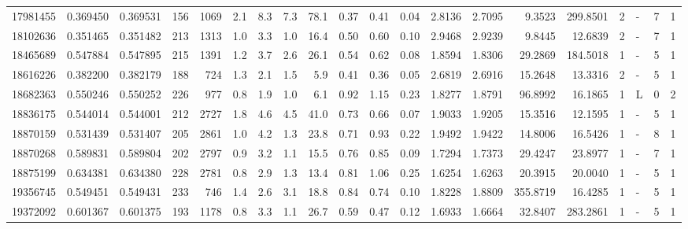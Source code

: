 \begin{tabular}{rrrrrrrrrrrrrrrrrlrl}
  17981455 & 0.369450 & 0.369531 &  156 & 1069 &      2.1 &      8.3 &     7.3 &    78.1 &   0.37 &   0.41 &       0.04 &  2.8136 &  2.7095 &    9.3523 &  299.8501 &       2 &             - &        7 &         1 \\
  18102636 & 0.351465 & 0.351482 &  213 & 1313 &      1.0 &      3.3 &     1.0 &    16.4 &   0.50 &   0.60 &       0.10 &  2.9468 &  2.9239 &    9.8445 &   12.6839 &       2 &             - &        7 &         1 \\
  18465689 & 0.547884 & 0.547895 &  215 & 1391 &      1.2 &      3.7 &     2.6 &    26.1 &   0.54 &   0.62 &       0.08 &  1.8594 &  1.8306 &   29.2869 &  184.5018 &       1 &             - &        5 &         1 \\
  18616226 & 0.382200 & 0.382179 &  188 &  724 &      1.3 &      2.1 &     1.5 &     5.9 &   0.41 &   0.36 &       0.05 &  2.6819 &  2.6916 &   15.2648 &   13.3316 &       2 &             - &        5 &         1 \\
  18682363 & 0.550246 & 0.550252 &  226 &  977 &      0.8 &      1.9 &     1.0 &     6.1 &   0.92 &   1.15 &       0.23 &  1.8277 &  1.8791 &   96.8992 &   16.1865 &       1 &             L &        0 &         2 \\
  18836175 & 0.544014 & 0.544001 &  212 & 2727 &      1.8 &      4.6 &     4.5 &    41.0 &   0.73 &   0.66 &       0.07 &  1.9033 &  1.9205 &   15.3516 &   12.1595 &       1 &             - &        5 &         1 \\
  18870159 & 0.531439 & 0.531407 &  205 & 2861 &      1.0 &      4.2 &     1.3 &    23.8 &   0.71 &   0.93 &       0.22 &  1.9492 &  1.9422 &   14.8006 &   16.5426 &       1 &             - &        8 &         1 \\
  18870268 & 0.589831 & 0.589804 &  202 & 2797 &      0.9 &      3.2 &     1.1 &    15.5 &   0.76 &   0.85 &       0.09 &  1.7294 &  1.7373 &   29.4247 &   23.8977 &       1 &             - &        7 &         1 \\
  18875199 & 0.634381 & 0.634380 &  228 & 2781 &      0.8 &      2.9 &     1.3 &    13.4 &   0.81 &   1.06 &       0.25 &  1.6254 &  1.6263 &   20.3915 &   20.0040 &       1 &             - &        5 &         1 \\
  19356745 & 0.549451 & 0.549431 &  233 &  746 &      1.4 &      2.6 &     3.1 &    18.8 &   0.84 &   0.74 &       0.10 &  1.8228 &  1.8809 &  355.8719 &   16.4285 &       1 &             - &        5 &         1 \\
  19372092 & 0.601367 & 0.601375 &  193 & 1178 &      0.8 &      3.3 &     1.1 &    26.7 &   0.59 &   0.47 &       0.12 &  1.6933 &  1.6664 &   32.8407 &  283.2861 &       1 &             - &        5 &         1 \\

\end{tabular}
